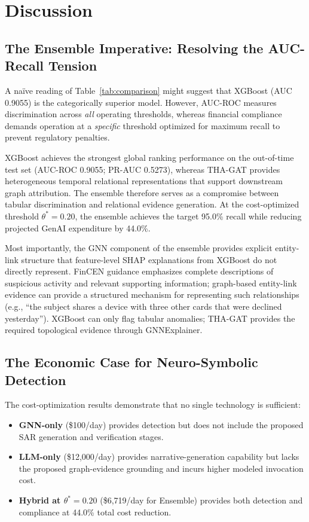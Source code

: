 \documentclass[journal]{IEEEtran}
\begin{document}
\section{Discussion}

\subsection{The Ensemble Imperative: Resolving the AUC-Recall Tension}

A na\"{i}ve reading of Table~\ref{tab:comparison} might suggest that XGBoost (AUC 0.9055) is the categorically superior model. However, AUC-ROC measures discrimination across \emph{all} operating thresholds, whereas financial compliance demands operation at a \emph{specific} threshold optimized for maximum recall to prevent regulatory penalties. 

XGBoost achieves the strongest global ranking performance on the out-of-time test set (AUC-ROC 0.9055; PR-AUC 0.5273), whereas THA-GAT provides heterogeneous temporal relational representations that support downstream graph attribution. The ensemble therefore serves as a compromise between tabular discrimination and relational evidence generation. At the cost-optimized threshold $\theta^*=0.20$, the ensemble achieves the target 95.0\% recall while reducing projected GenAI expenditure by 44.0\%.

Most importantly, the GNN component of the ensemble provides explicit entity-link structure that feature-level SHAP explanations from XGBoost do not directly represent. FinCEN guidance emphasizes complete descriptions of suspicious activity and relevant supporting information; graph-based entity-link evidence can provide a structured mechanism for representing such relationships (e.g., ``the subject shares a device with three other cards that were declined yesterday''). XGBoost can only flag tabular anomalies; THA-GAT provides the required topological evidence through GNNExplainer.

\subsection{The Economic Case for Neuro-Symbolic Detection}

The cost-optimization results demonstrate that no single technology is sufficient:
\begin{itemize}
    \item \textbf{GNN-only} (\$100/day) provides detection but does not include the proposed SAR generation and verification stages.
    \item \textbf{LLM-only} (\$12,000/day) provides narrative-generation capability but lacks the proposed graph-evidence grounding and incurs higher modeled invocation cost.
    \item \textbf{Hybrid at $\theta^* = 0.20$} (\$6,719/day for Ensemble) provides both detection and compliance at 44.0\% total cost reduction.
\end{itemize}
\end{document}
